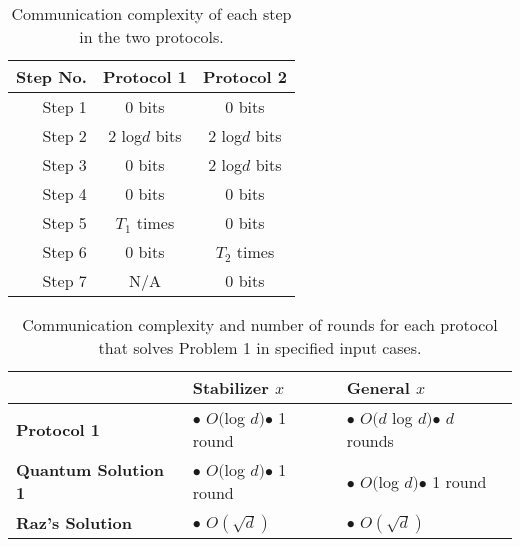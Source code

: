 \documentclass[../3Wworkreport.tex]{subfiles}
\begin{document}
\begin{table}[h]
\begin{center}
\begin{tabular}{r | c | c}
	\textbf{Step No.} & \textbf{Protocol 1} & \textbf{Protocol 2}\\\hline
	Step 1 & 0 bits & 0 bits \\\hline
	Step 2 & 2 log$d$ bits & 2 log$d$ bits \\\hline
	Step 3 & 0 bits& 2 log$d$ bits \\\hline
	Step 4 & 0 bits & 0 bits\\\hline
	Step 5 & $T_1$ times & 0 bits \\\hline
	Step 6 & 0 bits & $T_2$ times\\\hline
	Step 7 & N/A & 0 bits \\\hline
\end{tabular}
\end{center}
	\caption{Communication complexity of each step in the two protocols.}
	\label{tab:step_complex}
\end{table}

\begin{table}[h]
\begin{center}
\begin{tabular}{l | p{} | p{}}
	& {\bfseries Stabilizer $x$} & \textbf{General $x$}\\\hline
	\textbf{Protocol 1}
		& $\bullet$ $O($log $d)$\newline $\bullet$ 1 round
		& $\bullet$ $O(d$ log $d)$\newline $\bullet$ $d$ rounds \\\hline
	\textbf{Quantum Solution 1}
		& $\bullet$ $O($log $d)$\newline $\bullet$ 1 round
		& $\bullet$ $O($log $d)$\newline $\bullet$ 1 round \\\hline
	\textbf{Raz's Solution}
		& $\bullet$ $O(\sqrt{d})$
		& $\bullet$ $O(\sqrt{d})$ \\\hline
\end{tabular}
\end{center}
	\caption[Communication complexity of protocols for Problem 1.]{Communication complexity and number of rounds for each protocol that solves Problem 1 in specified input cases.}
	\label{tab:protocol_complex1}
\end{table}
\end{document}
